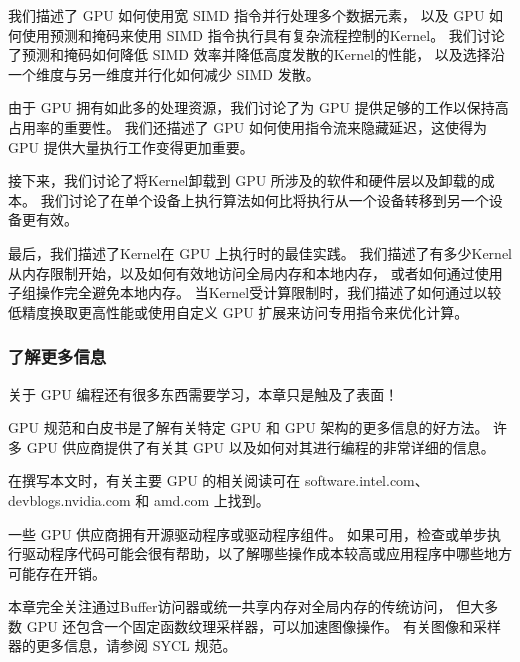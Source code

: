 我们描述了 GPU 如何使用宽 SIMD 指令并行处理多个数据元素，
以及 GPU 如何使用预测和掩码来使用 SIMD 指令执行具有复杂流程控制的Kernel。 
我们讨论了预测和掩码如何降低 SIMD 效率并降低高度发散的Kernel的性能，
以及选择沿一个维度与另一维度并行化如何减少 SIMD 发散。

由于 GPU 拥有如此多的处理资源，我们讨论了为 GPU 提供足够的工作以保持高占用率的重要性。 
我们还描述了 GPU 如何使用指令流来隐藏延迟，这使得为 GPU 提供大量执行工作变得更加重要。

接下来，我们讨论了将Kernel卸载到 GPU 所涉及的软件和硬件层以及卸载的成本。 
我们讨论了在单个设备上执行算法如何比将执行从一个设备转移到另一个设备更有效。

最后，我们描述了Kernel在 GPU 上执行时的最佳实践。 
我们描述了有多少Kernel从内存限制开始，以及如何有效地访问全局内存和本地内存，
或者如何通过使用子组操作完全避免本地内存。 
当Kernel受计算限制时，我们描述了如何通过以较低精度换取更高性能或使用自定义 GPU 扩展来访问专用指令来优化计算。

\subsubsection{了解更多信息}
关于 GPU 编程还有很多东西需要学习，本章只是触及了表面！

GPU 规范和白皮书是了解有关特定 GPU 和 GPU 架构的更多信息的好方法。 
许多 GPU 供应商提供了有关其 GPU 以及如何对其进行编程的非常详细的信息。

在撰写本文时，有关主要 GPU 的相关阅读可在 software.intel.com、devblogs.nvidia.com 和 amd.com 上找到。

一些 GPU 供应商拥有开源驱动程序或驱动程序组件。 
如果可用，检查或单步执行驱动程序代码可能会很有帮助，以了解哪些操作成本较高或应用程序中哪些地方可能存在开销。

本章完全关注通过Buffer访问器或统一共享内存对全局内存的传统访问，
但大多数 GPU 还包含一个固定函数纹理采样器，可以加速图像操作。 有关图像和采样器的更多信息，请参阅 SYCL 规范。